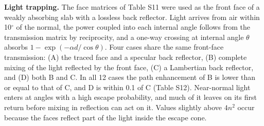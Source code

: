 \documentclass[10pt]{article}
\begin{document}
\textbf{Light trapping.} The face matrices of Table S11 were used as the front face of a weakly absorbing slab with a lossless back reflector. Light arrives from air within 10\ensuremath{^\circ} of the normal, the power coupled into each internal angle follows from the transmission matrix by reciprocity, and a one-way crossing at internal angle $\theta$ absorbs $1-\exp(-\alpha d/\cos\theta)$. Four cases share the same front-face transmission: (A) the traced face and a specular back reflector, (B) complete mixing of the light reflected by the front face, (C) a Lambertian back reflector, and (D) both B and C. In all 12 cases the path enhancement of B is lower than or equal to that of C, and D is within 0.1 of C (Table S12). Near-normal light enters at angles with a high escape probability, and much of it leaves on its first return before mixing in reflection can act on it. Values slightly above $4n^2$ occur because the faces reflect part of the light inside the escape cone.
\end{document}
